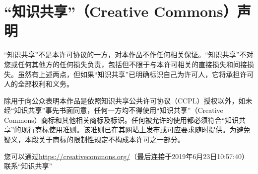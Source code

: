 \section{“知识共享”（Creative Commons）声明}
“知识共享”不是本许可协议的一方，对本作品不作任何相关保证。“知识共享”不对您或任何其他方的任何损失负责，包括但不限于与本许可相关的直接损失和间接损失。虽然有上述两点，但如果“知识共享”已明确标识自己为许可人，它将承担许可人的全部权利和义务。\par
除用于向公众表明本作品是依照知识共享公共许可协议（CCPL）授权以外，如未经“知识共享”事先书面同意，任何一方均不得使用“知识共享”（Creative Commons）商标和其他相关商标及标识。任何被允许的使用都必须符合“知识共享”的现行商标使用准则。该准则已在其网站上发布或可应要求随时提供。为避免疑义，本段关于商标的限制性规定不构成本许可之一部分。\par
您可以通过\url{https://creativecommons.org/}（最后连接于2019年6月23日10:57:40）联系“知识共享”